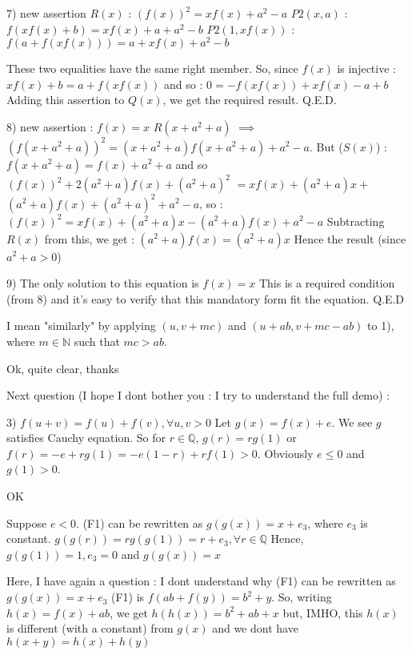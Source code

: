 \begin{solution}
7) new assertion $ R(x)$ : $ (f(x))^2 = xf(x) + a^2 - a$
$ P2(x,a)$ : $ f(xf(x)+b)=xf(x)+a+a^2-b$
$ P2(1,xf(x))$ : $ f(a+f(xf(x)))=a+xf(x)+a^2-b$

These two equalities have the same right member. So, since $ f(x)$ is injective : $ xf(x)+b=a+f(xf(x))$ and so :
$ 0=-f(xf(x))+xf(x)-a+b$
Adding this assertion to $ Q(x)$, we get the required result.
Q.E.D.

8) new assertion : $ f(x)=x$
$ R(x+a^2+a)$ $ \implies$ $ (f(x+a^2+a))^2 = (x+a^2+a)f(x+a^2+a) + a^2-a$.
But ($ S(x)$) : $ f(x+a^2+a)=f(x)+a^2+a$ and so $ (f(x))^2+2(a^2+a)f(x)+(a^2+a)^2$ $ = xf(x)+(a^2+a)x+$ $ (a^2+a)f(x)+(a^2+a)^2 + a^2-a$, so :
$ (f(x))^2 = xf(x)+(a^2+a)x -(a^2+a)f(x) + a^2-a$
Subtracting $ R(x)$ from this, we get :
$ (a^2+a)f(x)=(a^2+a)x$
Hence the result (since $ a^2+a>0$)

9) The only solution to this equation is $ f(x)=x$
This is a required condition (from 8) and it's easy to verify that this mandatory form fit the equation.
Q.E.D
\end{solution}



\begin{solution}
	I mean "similarly" by applying $ (u,v+mc)$ and $ (u+ab,v+mc-ab)$ to 1), where $ m\in\mathbb N$ such that $ mc>ab$.
\end{solution}



\begin{solution}
	Ok, quite clear, thanks

Next question (I hope I dont bother you : I try to understand the full demo) :

\begin{tcolorbox} 
3) $ f(u + v) = f(u) + f(v),\forall u,v > 0$
Let $ g(x) = f(x) + e$. We see $ g$ satisfies Cauchy equation.
So for $ r\in\mathbb Q$, $ g(r) = rg(1)$ or $ f(r) = - e + rg(1) = - e(1 - r) + rf(1) > 0$.
Obviously $ e\le0$ and $ g(1) > 0$. \end{tcolorbox}
OK

\begin{tcolorbox} Suppose $ e < 0$.
(F1) can be rewritten as $ g(g(x)) = x + e_3$, where $ e_3$ is constant.
$ g(g(r)) = rg(g(1)) = r + e_3,\forall r\in\mathbb Q$
Hence, $ g(g(1)) = 1,e_3 = 0$ and $ g(g(x)) = x$
\end{tcolorbox}

Here, I have again a question : I dont understand why (F1) can be rewritten as $ g(g(x)) = x + e_3$
(F1) is $ f(ab+f(y))=b^2+y$. So, writing $ h(x)=f(x)+ab$, we get $ h(h(x))=b^2+ab+x$ but, IMHO,  this $ h(x)$ is different (with a constant) from $ g(x)$ and we dont have $ h(x+y)=h(x)+h(y)$
\end{solution}



